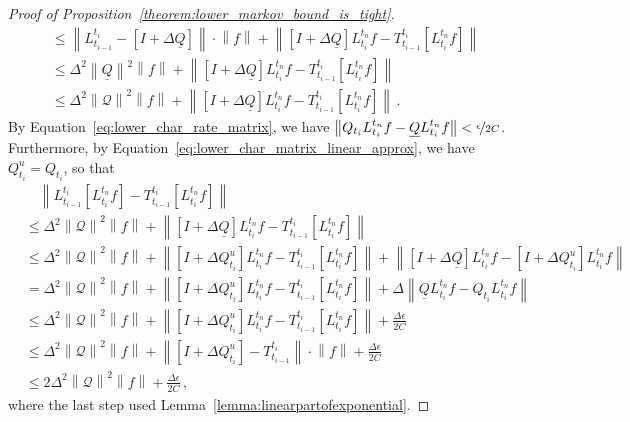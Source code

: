 \documentclass[10pt]{paper}
\theoremstyle{definition}
\newcommand{\lrate}{\underline{Q}}
\newcommand{\norm}[1]{\left\lVert #1 \right\rVert}
\begin{document}
\begin{proof}[Proof of Proposition~\ref{theorem:lower_markov_bound_is_tight}]
\begin{align*}
&\leq \norm{L_{t_{i-1}}^{t_i} - \left[I+\Delta\lrate\right]}\cdot\norm{f} + \norm{\left[I+\Delta\lrate\right]L_{t_i}^{t_n}f - T_{t_{i-1}}^{t_i}\left[L_{t_i}^{t_n}f\right]} \\
&\leq \Delta^2\norm{\lrate}^2\norm{f} + \norm{\left[I+\Delta\lrate\right]L_{t_i}^{t_n}f - T_{t_{i-1}}^{t_i}\left[L_{t_i}^{t_n}f\right]} \\
&\leq \Delta^2\norm{\mathcal{Q}}^2\norm{f} + \norm{\left[I+\Delta\lrate\right]L_{t_i}^{t_n}f - T_{t_{i-1}}^{t_i}\left[L_{t_i}^{t_n}f\right]}\,.
\end{align*}
By Equation~\eqref{eq:lower_char_rate_matrix}, we have $\norm{Q_{t_i}L_{t_i}^{t_n}f - \lrate L_{t_i}^{t_n}f} < \nicefrac{\epsilon}{2C}$. Furthermore, by Equation~\eqref{eq:lower_char_matrix_linear_approx}, we have $Q_{t_i}^u=Q_{t_i}$, so that
\begin{align*}
 &\quad \norm{L_{t_{i-1}}^{t_i}\left[L_{t_i}^{t_n}f\right] - T_{t_{i-1}}^{t_i}\left[L_{t_i}^{t_n}f\right]} \\
 &\leq \Delta^2\norm{\mathcal{Q}}^2\norm{f} + \norm{\left[I+\Delta\lrate\right]L_{t_i}^{t_n}f - T_{t_{i-1}}^{t_i}\left[L_{t_i}^{t_n}f\right]} \\
 &\leq \Delta^2\norm{\mathcal{Q}}^2\norm{f} + \norm{\left[I+\Delta Q_{t_i}^u\right]L_{t_i}^{t_n}f - T_{t_{i-1}}^{t_i}\left[L_{t_i}^{t_n}f\right]} + \norm{\left[I+\Delta \lrate\right]L_{t_i}^{t_n}f - \left[I+\Delta Q_{t_i}^u\right]L_{t_i}^{t_n}f} \\
 &= \Delta^2\norm{\mathcal{Q}}^2\norm{f} + \norm{\left[I+\Delta Q_{t_i}^u\right]L_{t_i}^{t_n}f - T_{t_{i-1}}^{t_i}\left[L_{t_i}^{t_n}f\right]} + \Delta\norm{\lrate L_{t_i}^{t_n}f - Q_{t_i}L_{t_i}^{t_n}f} \\
 &\leq \Delta^2\norm{\mathcal{Q}}^2\norm{f} + \norm{\left[I+\Delta Q_{t_i}^u\right]L_{t_i}^{t_n}f - T_{t_{i-1}}^{t_i}\left[L_{t_i}^{t_n}f\right]} + \frac{\Delta\epsilon}{2C} \\
 &\leq \Delta^2\norm{\mathcal{Q}}^2\norm{f} + \norm{\left[I+\Delta Q_{t_i}^u\right] - T_{t_{i-1}}^{t_i}}\cdot\norm{f} + \frac{\Delta\epsilon}{2C} \\
 &\leq 2\Delta^2\norm{\mathcal{Q}}^2\norm{f} + \frac{\Delta\epsilon}{2C}\,,
\end{align*}
where the last step used Lemma~\ref{lemma:linearpartofexponential}.


\end{proof}
\end{document}
